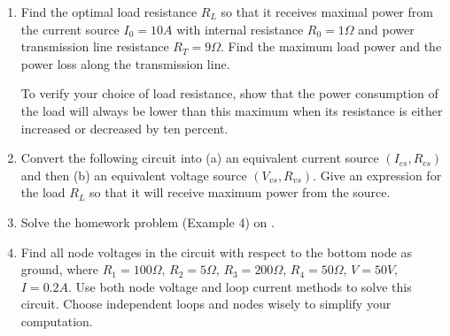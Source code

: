 \begin{enumerate}
\item Find the optimal load resistance $R_L$ so that it receives maximal
power from the current source $I_0=10A$ with internal resistance 
$R_0=1\Omega$ and power transmission line resistance $R_T=9\Omega$. 
Find the maximum load power and the power loss along the transmission 
line.


To verify your choice of load resistance, show that the power consumption
of the load will always be lower than this maximum when its resistance is 
either increased or decreased by ten percent.



\item Convert the following circuit into (a) an equivalent current 
  source $(I_{cs}, R_{cs})$ and then (b) an equivalent voltage source
  $(V_{vs}, R_{vs})$. Give an expression for the load $R_L$ so that it 
  will receive maximum power from the source.


% 
   
\item Solve the homework problem (Example 4) on 
  .

\item Find all node voltages in the circuit with respect to the bottom node as
  ground, where $R_1=100\Omega$, $R_2=5\Omega$, $R_3=200\Omega$, $R_4=50\Omega$, 
  $V=50V$, $I=0.2A$.  Use both node voltage and loop current methods to solve 
  this circuit. Choose independent loops and nodes wisely to simplify your
  computation.  


\end{enumerate}


